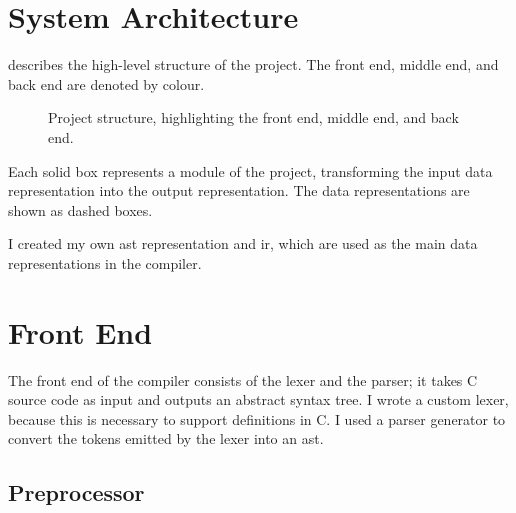 \documentclass[00-main.tex]{subfiles}
\begin{document}
\section{System Architecture}

 describes the high-level structure of the project. The \textcolor{frontendcolor}{front end}, \textcolor{middleendcolor}{middle end}, and \textcolor{backendcolor}{back end} are denoted by colour.

\begin{figure}[!ht]
  \centering
  \caption{Project structure, highlighting the \textcolor{frontendcolor}{front end}, \textcolor{middleendcolor}{middle end}, and \textcolor{backendcolor}{back end}.}
  \label{fig:project flowchart}
\end{figure}

Each solid box represents a module of the project, transforming the input data representation into the output representation.
The data representations are shown as dashed boxes.

I created my own \gls{ast} representation and \gls{ir}, which are used as the main data representations in the compiler.


\section{Front End}


The front end of the compiler consists of the lexer and the parser; it takes C source code as input and outputs an abstract syntax tree.
I wrote a custom lexer, because this is necessary to support  definitions in C\@.
I used a parser generator to convert the tokens emitted by the lexer into an \gls{ast}\@.

\subsection{Preprocessor}
\end{document}
